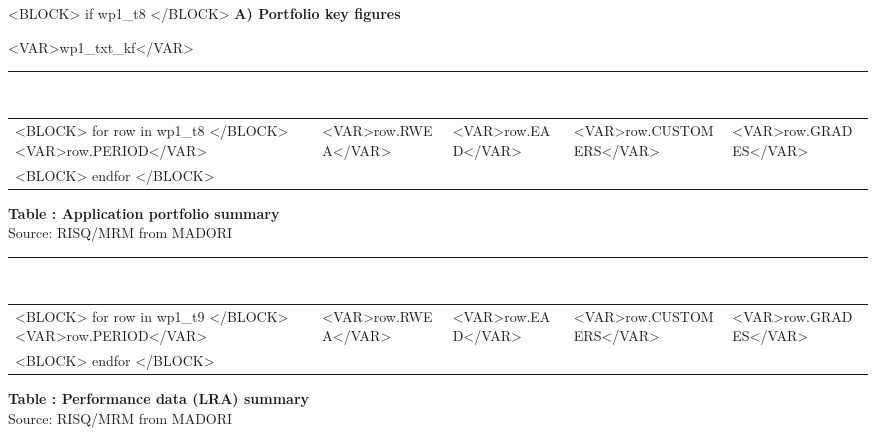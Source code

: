 \documentclass[10pt, a4paper]{article}
\newcounter{tableCounter}
\begin{document}
<BLOCK> if wp1_t8 </BLOCK>
\vspace{0.5cm}
\noindent\textbf{A) Portfolio key figures}

<VAR>wp1_txt_kf</VAR>

\vspace{0.3cm}
\noindent\begin{tabularx}{\textwidth}{|X|>{\centering\arraybackslash}p{2.5cm}|>{\centering\arraybackslash}p{2.5cm}|>{\centering\arraybackslash}p{2cm}|>{\centering\arraybackslash}p{2cm}|}
\hline
\rowcolor{sgred}
\centering\textcolor{white}{\textbf{PERIOD}} & \centering\textcolor{white}{\textbf{RWEA}} & \centering\textcolor{white}{\textbf{EAD}} & \centering\textcolor{white}{\textbf{NO. OF CUSTOMERS}} & \centering\arraybackslash\textcolor{white}{\textbf{NO. OF RATING GRADES}} \\
\hline
<BLOCK> for row in wp1_t8 </BLOCK>
<VAR>row.PERIOD</VAR> & \centering<VAR>row.RWEA</VAR> & \centering<VAR>row.EAD</VAR> & \centering<VAR>row.CUSTOMERS</VAR> & \centering\arraybackslash<VAR>row.GRADES</VAR> \\
\hline
<BLOCK> endfor </BLOCK>
\end{tabularx}
\begin{center}
\scriptsize \textbf{Table \thetableCounter: Application portfolio summary} \\
Source: RISQ/MRM from MADORI
\end{center}

\vspace{0.3cm}
\noindent\begin{tabularx}{\textwidth}{|X|>{\centering\arraybackslash}p{2.5cm}|>{\centering\arraybackslash}p{2.5cm}|>{\centering\arraybackslash}p{2cm}|>{\centering\arraybackslash}p{2cm}|}
\hline
\rowcolor{sgred}
\centering\textcolor{white}{\textbf{PERIOD}} & \centering\textcolor{white}{\textbf{RWEA}} & \centering\textcolor{white}{\textbf{EAD}} & \centering\textcolor{white}{\textbf{NO. OF CUSTOMERS}} & \centering\arraybackslash\textcolor{white}{\textbf{NO. OF RATING GRADES}} \\
\hline
<BLOCK> for row in wp1_t9 </BLOCK>
<VAR>row.PERIOD</VAR> & \centering<VAR>row.RWEA</VAR> & \centering<VAR>row.EAD</VAR> & \centering<VAR>row.CUSTOMERS</VAR> & \centering\arraybackslash<VAR>row.GRADES</VAR> \\
\hline
<BLOCK> endfor </BLOCK>
\end{tabularx}
\begin{center}
\scriptsize \textbf{Table \thetableCounter: Performance data (LRA) summary} \\
Source: RISQ/MRM from MADORI
\end{center}
\end{document}
